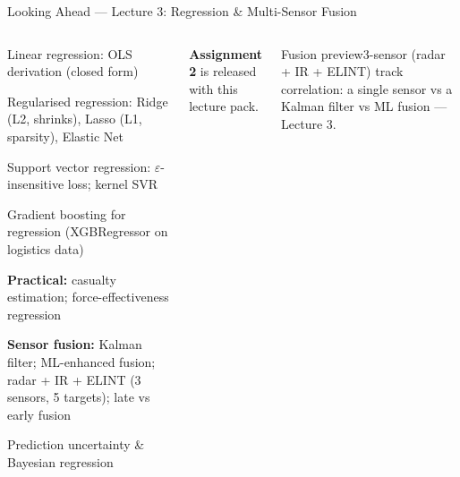 \documentclass[aspectratio=169,10pt,t]{beamer}
\begin{document}
\begin{frame}{Looking Ahead --- Lecture 3: Regression \& Multi-Sensor Fusion}
\begin{columns}[T]
\begin{tl}\item Linear regression: OLS derivation (closed form)\item Regularised regression: Ridge (L2, shrinks), Lasso (L1, sparsity), Elastic Net\item Support vector regression: $\varepsilon$-insensitive loss; kernel SVR\item Gradient boosting for regression (XGBRegressor on logistics data)\item \textbf{Practical:} casualty estimation; force-effectiveness regression\item \textbf{Sensor fusion:} Kalman filter; ML-enhanced fusion; radar + IR + ELINT (3 sensors, 5 targets); late vs early fusion\item Prediction uncertainty \& Bayesian regression\end{tl}
\begin{ibox}\scriptsize \textbf{Assignment 2} is released with this lecture pack.\end{ibox}
\begin{cbox}[ISSAnavy]{Fusion preview}\scriptsize 3-sensor (radar + IR + ELINT) track correlation: a single sensor vs a Kalman filter vs ML fusion --- Lecture 3.\end{cbox}
\end{columns}
\end{frame}
\end{document}
